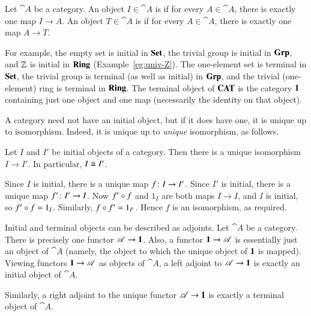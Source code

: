 \begin{defn}
\label{defn:init-term}
Let $\cat{A}$ be a category.  An object $I \in \cat{A}$ is %
%
%
if for every $A \in \cat{A}$, there is exactly one map $I \to A$.  An
object $T \in \cat{A}$ is %
%
%
if for every $A \in \cat{A}$, there is exactly one map $A \to T$.
\end{defn}

For example, the empty set is initial in $\mathbf{Set}$, the trivial group is
initial in $\mathbf{Grp}$, and $\mathbb{Z}$%
%
%
is initial in $\mathbf{Ring}$ (Example~\ref{eg:univ-Z}).  The one-element set is
terminal in $\mathbf{Set}$, the trivial group is terminal (as well as initial) in
$\mathbf{Grp}$, and the trivial (one-element) ring is terminal in $\mathbf{Ring}$.  The
terminal object of $\mathbf{CAT}$ is the category $\mathbf{1}$ containing just one object
and one map (necessarily the identity on that object).

A category need not have an initial object, but if it does have one, it is
unique%
%
%
up to isomorphism.  Indeed, it is unique up to \emph{unique} isomorphism,
as follows.

\begin{lemma}
\label{lemma:init-unique}
Let $I$ and $I'$ be initial objects of a category.  Then there is a unique
isomorphism $I \to I'$.  In particular, $I \cong I'$.
\end{lemma}

\begin{pf}
Since $I$ is initial, there is a unique map $f\from I \to I'$.  Since $I'$
is initial, there is a unique map $f'\from I' \to I$.  Now $f' \mathbin{\circ} f$ and
$1_I$ are both maps $I \to I$, and $I$ is initial, so $f' \mathbin{\circ} f = 1_I$.
Similarly, $f \mathbin{\circ} f' = 1_{I'}$.  Hence $f$ is an isomorphism, as required.
\end{pf}

\begin{example}
\label{eg:init-term}
%
%
Initial and terminal objects can be described as adjoints.  Let $\cat{A}$
be a category.  There is precisely one functor $\mathscr{A} \to \mathbf{1}$.  Also, a
functor $\mathbf{1} \to \mathscr{A}$ is essentially just an object of $\cat{A}$
(namely, the object to which the unique object of $\mathbf{1}$ is mapped).
Viewing functors $\mathbf{1} \to \mathscr{A}$ as objects of $\cat{A}$, a left adjoint
to $\mathscr{A} \to \mathbf{1}$ is exactly an initial object of $\cat{A}$.

Similarly, a right adjoint to the unique functor $\mathscr{A} \to \mathbf{1}$ is
exactly a terminal object of $\cat{A}$.
\end{example}

